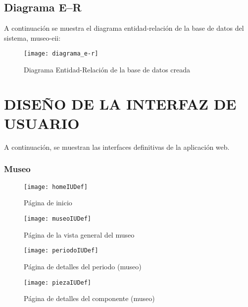 \subsection{Diagrama E--R} 
A continuación se muestra el diagrama entidad-relación de la base de datos del sistema, museo-eii:
\begin{figure}[H]
\centering
\texttt{[image: diagrama\_e-r]}
\caption{Diagrama Entidad-Relación de la base de datos creada}
\end{figure}


\newpage

\section{DISEÑO DE LA INTERFAZ DE USUARIO}
A continuación, se muestran las interfaces definitivas de la aplicación web.
\subsubsection{Museo}
\begin{figure}[H]
\centering
\texttt{[image: homeIUDef]}
\caption{Página de inicio}
\end{figure}
\begin{figure}[H]
\centering
\texttt{[image: museoIUDef]}
\caption{Página de la vista general del museo}
\end{figure}
\begin{figure}[H]
\centering
\texttt{[image: periodoIUDef]}
\caption{Página de detalles del periodo (museo)}
\end{figure}
\begin{figure}[H]
\centering
\texttt{[image: piezaIUDef]}
\caption{Página de detalles del componente (museo)}
\end{figure}

